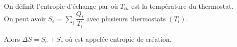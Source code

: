 \documentclass[a4paper]{article}
\begin{document}
\pagestyle{fancy}
\fancyhf{}
\setlength{\headheight}{15pt}

\begin{center}
	\large{}
\end{center}


On définit l'entropie d'échange par  où \( T_{th} \) est la température du thermostat. \\
On peut avoir \( S_e = \displaystyle\sum_i \dfrac{Q_i}{T_i} \) avec plusieurs thermostats \( (T_i) \).

Alors \( \Delta S = S_e + S_c \) où  est appelée entropie de création.
\end{document}
